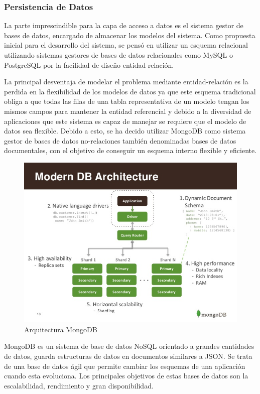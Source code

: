\documentclass[a4paper,11pt]{book}
\begin{document}
\subsubsection{Persistencia de Datos}

La parte imprescindible para la capa de acceso a datos es el sistema gestor de bases de datos, encargado de almacenar los modelos del sistema. Como propuesta inicial para el desarrollo del sistema, se pensó en utilizar un esquema relacional utilizando sistemas gestores de bases de datos relacionales como MySQL o PostgreSQL  por la facilidad de diseño entidad-relación. 

La principal desventaja de modelar el problema mediante entidad-relación es la perdida en la flexibilidad de los modelos de datos ya que este esquema tradicional obliga a que todas las filas de una tabla representativa de un modelo tengan los mismos campos para mantener la entidad referencial y debido a la diversidad de aplicaciones que este sistema es capaz de manejar se requiere que el modelo de datos sea flexible. Debido a esto, se ha decido utilizar MongoDB\cite{mg} como sistema gestor de bases de datos no-relaciones también denominadas bases de datos documentales, con el objetivo de conseguir un esquema interno flexible y eficiente. 

\begin{figure}[H] 
\centering 
\includegraphics[scale=0.30]{imagenes/mongo.jpg}
\caption{ Arquitectura MongoDB\cite{mongoA}  }  
\end{figure} 

MongoDB es un sistema de base de datos NoSQL orientado a grandes cantidades de datos, guarda estructuras de datos en documentos similares a JSON. Se trata de una base de datos ágil que permite cambiar los esquemas de una aplicación cuando esta evoluciona. Los principales objetivos de estas bases de datos son la escalabilidad, rendimiento y gran disponibilidad.
\end{document}
